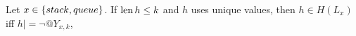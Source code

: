 \begin{theorem}
  Let $x \in {\{ stack, queue \}}$.
  If $\operatorname{len} h \le k$ and $h$ uses unique values,
  then $h \in H(L_x)$ iff $h |= \lnot @Y_{x,k}$,
\end{theorem}


